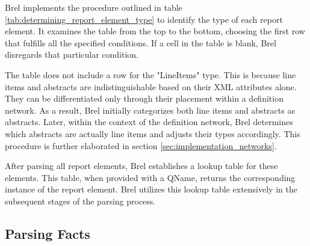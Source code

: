 


Brel implements the procedure outlined in table \ref{tab:determining_report_element_type} to identify the type of each report element.
It examines the table from the top to the bottom, choosing the first row that fulfills all the specified conditions.
If a cell in the table is blank, Brel disregards that particular condition.

The table does not include a row for the "LineItems" type.
This is because line items and abstracts are indistinguishable based on their XML attributes alone.
They can be differentiated only through their placement within a definition network.
As a result, Brel initially categorizes both line items and abstracts as abstracts.
Later, within the context of the definition network, Brel determines which abstracts are actually line items and adjusts their types accordingly.
This procedure is further elaborated in section \ref{sec:implementation_networks}.

After parsing all report elements, Brel establishes a lookup table for these elements.
This table, when provided with a QName, returns the corresponding instance of the report element.
Brel utilizes this lookup table extensively in the subsequent stages of the parsing process.

\subsection{Parsing Facts}


